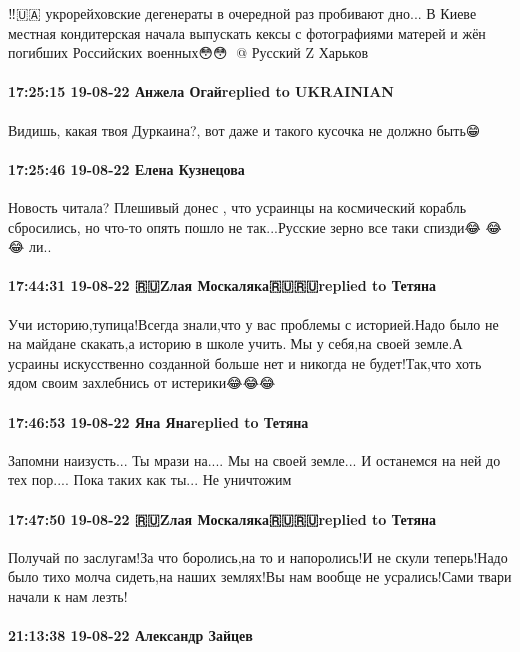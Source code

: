‼️🇺🇦 укрорейховские дегенераты в очередной раз пробивают дно...
В Киеве местная кондитерская начала выпускать кексы с фотографиями матерей и жён погибших Российских военных😳😳🤔
@ Русский Z Харьков

\paragraph{17:25:15 19-08-22 Анжела Огайreplied to UKRAINIAN}

Видишь, какая твоя Дуркаина?, вот даже и такого кусочка не должно быть😁

\paragraph{17:25:46 19-08-22 Елена Кузнецова}

Новость читала? Плешивый донес , что усраинцы на космический корабль
сбросились, но что-то опять пошло не так...Русские зерно все таки спизди😂 😂
😂 ли..

\paragraph{17:44:31 19-08-22 🇷🇺Zлая Москаляка🇷🇺🇷🇺replied to Тетяна}

Учи историю,тупица!Всегда знали,что у вас проблемы с историей.Надо было не на
майдане скакать,а историю в школе учить.🤣Мы у себя,на своей земле.А усраины
искусственно созданной больше нет и никогда не будет!Так,что хоть ядом своим
захлебнись от истерики😂😂😂

\paragraph{17:46:53 19-08-22 Яна Янаreplied to Тетяна}

Запомни наизусть... Ты мрази на.... Мы на своей земле... И останемся на ней до
тех пор.... Пока таких как ты... Не уничтожим

\paragraph{17:47:50 19-08-22 🇷🇺Zлая Москаляка🇷🇺🇷🇺replied to Тетяна}

Получай по заслугам!За что боролись,на то и напоролись!И не скули теперь!Надо
было тихо молча сидеть,на наших землях!Вы нам вообще не усрались!Сами твари
начали к нам лезть!

\paragraph{21:13:38 19-08-22 Александр Зайцев}

